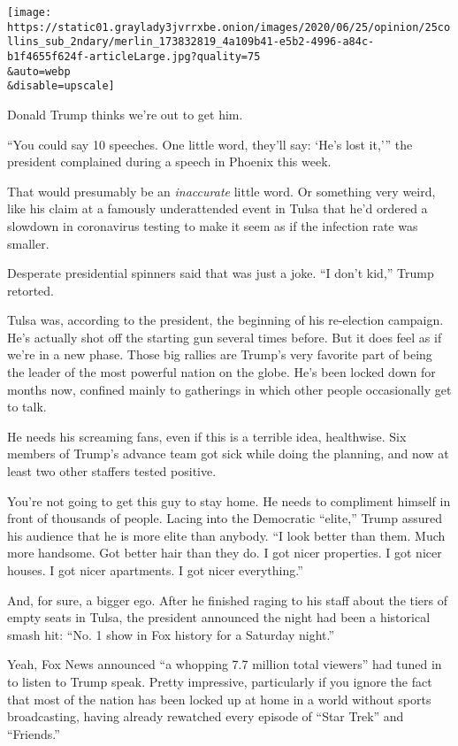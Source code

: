 \texttt{[image: https://static01.graylady3jvrrxbe.onion/images/2020/06/25/opinion/25collins\_sub\_2ndary/merlin\_173832819\_4a109b41-e5b2-4996-a84c-b1f4655f624f-articleLarge.jpg?quality=75\\\&auto=webp\\\&disable=upscale]}

Donald Trump thinks we're out to get him.

``You could say 10 speeches. One little word, they'll say: `He's lost
it,''' the president complained during a speech in Phoenix this week.

That would presumably be an \emph{inaccurate} little word. Or something
very weird, like his claim at a famously underattended event in Tulsa
that he'd ordered a slowdown in coronavirus testing to make it seem as
if the infection rate was smaller.

Desperate presidential spinners said that was just a joke. ``I don't
kid,'' Trump retorted.

Tulsa was, according to the president, the beginning of his re-election
campaign. He's actually shot off the starting gun several times before.
But it does feel as if we're in a new phase. Those big rallies are
Trump's very favorite part of being the leader of the most powerful
nation on the globe. He's been locked down for months now, confined
mainly to gatherings in which other people occasionally get to talk.

He needs his screaming fans, even if this is a terrible idea,
healthwise. Six members of Trump's advance team got sick while doing the
planning, and now at least two other staffers tested positive.

You're not going to get this guy to stay home. He needs to compliment
himself in front of thousands of people. Lacing into the Democratic
``elite,'' Trump assured his audience that he is more elite than
anybody. ``I look better than them. Much more handsome. Got better hair
than they do. I got nicer properties. I got nicer houses. I got nicer
apartments. I got nicer everything.''

And, for sure, a bigger ego. After he finished raging to his staff about
the tiers of empty seats in Tulsa, the president announced the night had
been a historical smash hit: ``No. 1 show in Fox history for a Saturday
night.''

Yeah, Fox News announced ``a whopping 7.7 million total viewers'' had
tuned in to listen to Trump speak. Pretty impressive, particularly if
you ignore the fact that most of the nation has been locked up at home
in a world without sports broadcasting, having already rewatched every
episode of ``Star Trek'' and ``Friends.''

